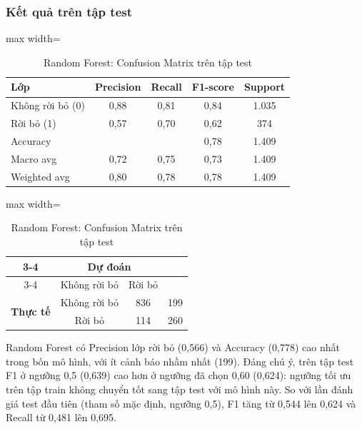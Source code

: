 \subsubsection{Kết quả trên tập test}
\begin{table}[H]
\centering
\begin{minipage}[t]{0.56\textwidth}
\centering
\small
\begin{adjustbox}{max width=\textwidth}
\begin{tabular}{|l|c|c|c|c|}
\hline
\textbf{Lớp} & \textbf{Precision} & \textbf{Recall} & \textbf{F1-score} & \textbf{Support} \\
\hline
Không rời bỏ (0) & 0,88 & 0,81 & 0,84 & 1.035 \\
\hline
Rời bỏ (1) & 0,57 & 0,70 & 0,62 & 374 \\
\hline
Accuracy & & & 0,78 & 1.409 \\
\hline
Macro avg & 0,72 & 0,75 & 0,73 & 1.409 \\
\hline
Weighted avg & 0,80 & 0,78 & 0,78 & 1.409 \\
\hline
\end{tabular}
\end{adjustbox}
\caption{Random Forest: kết quả phân loại trên tập test (ngưỡng 0,60; ROC-AUC 0,843; PR-AUC 0,651)}
\end{minipage}\hfill
\begin{minipage}[t]{0.42\textwidth}
\centering
\small
\begin{adjustbox}{max width=\textwidth}
\begin{tabular}{|c|c|c|c|}
\cline{3-4}
\multicolumn{2}{c|}{} & \multicolumn{2}{c|}{\textbf{Dự đoán}} \\
\cline{3-4}
\multicolumn{2}{c|}{} & Không rời bỏ & Rời bỏ \\
\hline
\multirow{2}{*}{\textbf{Thực tế}} & Không rời bỏ & \cellcolor{blue!30}836 & 199 \\
\cline{2-4}
 & Rời bỏ & 114 & \cellcolor{blue!30}260 \\
\hline
\end{tabular}
\end{adjustbox}
\caption{Random Forest: Confusion Matrix trên tập test}
\end{minipage}
\end{table}

Random Forest có Precision lớp rời bỏ (0,566) và Accuracy (0,778) cao nhất trong bốn mô hình, với ít cảnh báo nhầm nhất (199). Đáng chú ý, trên tập test F1 ở ngưỡng 0,5 (0,639) cao hơn ở ngưỡng đã chọn 0,60 (0,624): ngưỡng tối ưu trên tập train không chuyển tốt sang tập test với mô hình này. So với lần đánh giá test đầu tiên (tham số mặc định, ngưỡng 0,5), F1 tăng từ 0,544 lên 0,624 và Recall từ 0,481 lên 0,695.

